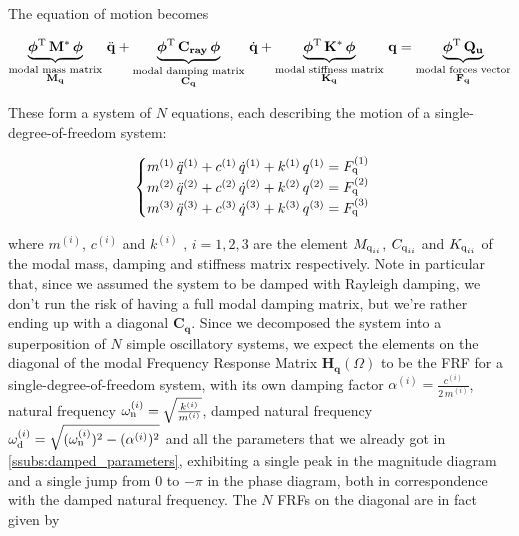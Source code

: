 \documentclass[a4paper,12pt,oneside]{article}
\begin{document}
The equation of motion becomes

\[
	\underbrace{\bm{\phi}^\textup{T} \, \mathbf{M^*} \, \bm{\phi}}_
		{\substack{\text{modal mass matrix} \\
		\text{$ \mathbf{M_q} $}}} \, \ddot{\mathbf{q}} +
		\underbrace{\bm{\phi}^\textup{T} \, \mathbf{C_{ray}} \,	\bm{\phi}}_
		{\substack{\text{modal damping matrix} \\
		\text{$ \mathbf{C_q} $}}} \, \dot{\mathbf{q}} +
		\underbrace{\bm{\phi}^\textup{T} \, \mathbf{K^*} \, \bm{\phi}}_
		{\substack{\text{modal stiffness matrix} \\
		\text{$ \mathbf{K_q} $}}} \, \mathbf{q} =
		\underbrace{\bm{\phi}^\textup{T} \, \mathbf{Q_u}}_
		{\substack{\text{modal forces vector} \\
		\text{$ \mathbf{F_q} $}}}
\]

These form a system of $ N $ equations, each describing the motion of a single-degree-of-freedom system:

\[ \begin{cases}
	m^{(1)} \, \ddot{q}^{(1)} + c^{(1)} \, \dot{q}^{(1)} + k^{(1)} \, q^{(1)} =
		F_\textup{q}^{(1)} \\
	m^{(2)} \, \ddot{q}^{(2)} + c^{(2)} \, \dot{q}^{(2)} + k^{(2)} \, q^{(2)} =
		F_\textup{q}^{(2)} \\
	m^{(3)} \, \ddot{q}^{(3)} + c^{(3)} \, \dot{q}^{(3)} + k^{(3)} \, q^{(3)} =
		F_\textup{q}^{(3)}
\end{cases} \]

where $ m^{(i)} $, $ c^{(i)} $ and $ k^{(i)} \text{ , } i = 1,2,3 $ are the element $ M_{\textup{q}_{ii}} $, $ C_{\textup{q}_{ii}} $ and $ K_{\textup{q}_{ii}} $ of the modal mass, damping and stiffness matrix respectively. Note in particular that, since we assumed the system to be damped with Rayleigh damping, we don't run the risk of having a full modal damping matrix, but we're rather ending up with a diagonal $ \mathbf{C_q} $. Since we decomposed the system into a superposition of $ N $ simple oscillatory systems, we expect the elements on the diagonal of the modal Frequency Response Matrix $ \mathbf{H_q}(\Omega) $ to be the FRF for a single-degree-of-freedom system, with its own damping factor $ \alpha^{(i)} = \frac{c^{(i)}}{2 \, m^{(i)}} $, natural frequency $ \omega_\textup{n}^{(i)} = \sqrt{\frac{k^{(i)}}{m^{(i)}}} $, damped natural frequency $ \omega_\textup{d}^{(i)} = \sqrt{(\omega_\textup{n}^{(i)})^2 - (\alpha^{(i)})^2} $ and all the parameters that we already got in \ref{ssubs:damped_parameters}, exhibiting a single peak in the magnitude diagram and a single jump from $ 0 $ to $ -\pi $ in the phase diagram, both in correspondence with the damped natural frequency. The $ N $ FRFs on the diagonal are in fact given by
\end{document}

